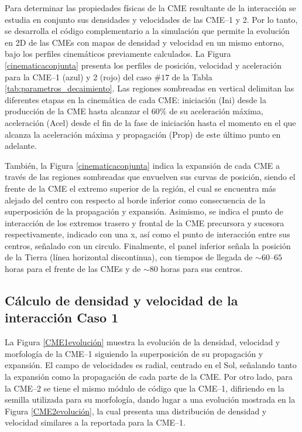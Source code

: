Para determinar las propiedades físicas de la CME resultante de la interacción se estudia en conjunto sus densidades y velocidades de las CME--1 y 2. Por lo tanto, se desarrolla el código complementario a la simulación que permite la evolución en 2D de las CMEs con mapas de densidad y velocidad en un mismo entorno, bajo los perfiles cinemáticos previamente calculados. La Figura \ref{cinematicaconjunta} presenta los perfiles de posición, velocidad y aceleración para la CME--1 (azul) y 2 (rojo) del caso $\#17$ de la Tabla \ref{tab:parametros_decaimiento}. Las regiones sombreadas en vertical delimitan las diferentes etapas en la cinemática de cada CME: iniciación (Ini) desde la producción de la CME hasta alcanzar el $60\%$ de su aceleración máxima, aceleración (Acel) desde el fin de la fase de iniciación hasta el momento en el que alcanza la aceleración máxima y propagación (Prop) de este último punto en adelante.

También, la Figura \ref{cinematicaconjunta} indica la expansión de cada CME a través de las regiones sombreadas que envuelven sus curvas de posición, siendo el frente de la CME el extremo superior de la región, el cual se encuentra más alejado del centro con respecto al borde inferior como consecuencia de la superposición de la propagación y expansión. Asimismo, se indica el punto de interacción de los extremos trasero y frontal de la CME precursora y sucesora respectivamente, indicado con una x, así como el punto de interacción entre sus centros, señalado con un circulo. Finalmente, el panel inferior señala la posición de la Tierra (línea horizontal discontinua), con tiempos de llegada de $\sim60$--$65$ horas para el frente de las CMEs y de $\sim80$ horas para sus centros.

\subsection{Cálculo de densidad y velocidad de la interacción Caso 1}

La Figura \ref{CME1evolución} muestra la evolución de la densidad, velocidad y morfología de la CME--1 siguiendo la superposición de su propagación y expansión. El campo de velocidades es radial, centrado en el Sol, señalando tanto la expansión como la propagación de cada parte de la CME. Por otro lado, para la CME--2 se tiene el mismo módulo de código que la CME--1, difiriendo en la semilla utilizada para su morfología, dando lugar a una evolución mostrada en la Figura \ref{CME2evolución}, la cual presenta una distribución de densidad y velocidad similares a la reportada para la CME--1.

